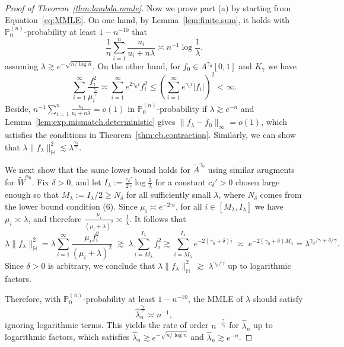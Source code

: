 \documentclass[12pt]{article}
\newcommand{\PP}{\mathbb{P}}
\newcommand{\bbH}{\mathbb{H}}
\newcommand{\s}{\sum_{i=1}^{\infty}}
\theoremstyle{plain}
\theoremstyle{nonitalicremark}
\begin{document}
\begin{appendices}
\begin{proof}[Proof of Theorem~\ref{thm:lambda.mmle}]
Now we prove part (a) by starting from Equation~\eqref{eq:MMLE}. On one hand, by Lemma~\ref{lem:finite.sum}, it holds with $\PP_0^{(n)}$-probability at least $1-n^{-10}$ that
\begin{equation}
\frac{1}{n} \sum_{i=1}^n \frac{u_i}{u_i + n\lambda} \asymp n^{-1}\log\frac{1}{\lambda}.
\end{equation}
assuming $\lambda \gtrsim e^{-\sqrt{n/\log n}}$. On the other hand, for $f_0\in A^{\gamma_0}[0,1]$ and $K_\gamma$ we have
\begin{equation}
\s \frac{f_i^2}{\mu_i^{\frac{\gamma_0}{\gamma}}} \asymp \s e^{2\gamma_0 i} f_i^2 \leq \left( \s e^{\gamma_0 i}|f_i| \right)^2 < \infty.
\end{equation}
Beside, $n^{-1} \sum_{i=1}^n \frac{u_i}{u_i + n\lambda} = o(1)$ in $\PP_0^{(n)}$-probability if $\lambda \gtrsim e^{-n}$ and Lemma~\ref{lem:exp.mismatch.deterministic} gives $\|f_\lambda - f_0\|_\infty = o(1)$, which satisfies the conditions in Theorem~\ref{thm:eb.contraction}. Similarly, we can show that $\lambda\|f_\lambda\|_\bbH^2 \lesssim \lambda^{\frac{\gamma_0}{\gamma}}$.

We next show that the same lower bound holds for $\widetilde A^{\gamma_0}$ using similar arugments for $\widetilde W^{\alpha_0}$.
Fix $\delta>0$, and let
$I_\lambda := \frac{c_{\delta}'}{2\gamma}\log\frac{1}{\lambda}$ for a constant $c_\delta' > 0$ chosen large enough so that $M_\lambda := I_\lambda / 2 \ge N_\delta$ for all sufficiently small $\lambda$, where $N_{\delta}$ comes from the lower bound condition (6). Since $\mu_i \asymp e^{-2\gamma i}$, for all $i\in[M_\lambda,I_\lambda]$ we have
$\mu_i \asymp \lambda$, and therefore $\frac{\mu_i}{(\mu_i+\lambda)^2} \asymp \frac{1}{\lambda}.$
It follows that
\[
\lambda\|f_\lambda\|_{\bbH}^2
=
\lambda \sum_{i=1}^\infty \frac{\mu_i f_i^2}{(\mu_i+\lambda)^2}
\;\gtrsim\;
\lambda \sum_{i=M_\lambda}^{I_\lambda} f_i^2
\gtrsim
\sum_{i=M_\lambda}^{I_\lambda} e^{-2(\gamma_0+\delta)i}
\;\asymp\;
e^{-2(\gamma_0+\delta)M_\lambda}  
=
\lambda^{\gamma_0/\gamma + \delta/\gamma}.
\]
Since $\delta>0$ is arbitrary, we conclude that $
\lambda\|f_\lambda\|_{\bbH}^2
\;\gtrsim\;
\lambda^{\gamma_0/\gamma}$ up to logarithmic factors. 

Therefore, with $\PP_0^{(n)}$-probability at least $1-n^{-10}$, the MMLE of $\lambda$ should satisfy
\begin{equation}
\hat\lambda_n^{\frac{\gamma_0}{\gamma}} \asymp n^{-1},
\end{equation}
ignoring logarithmic terms. This yields the rate of order  $n^{-\frac{\gamma}{\gamma_0}}$ for $\hat\lambda_n$ up to logarithmic factors, which satisfies $\hat\lambda_n \gtrsim e^{-\sqrt{n/\log n}}$ and $\hat\lambda_n \gtrsim e^{-n}$.
\end{proof}



\end{appendices}
\end{document}

